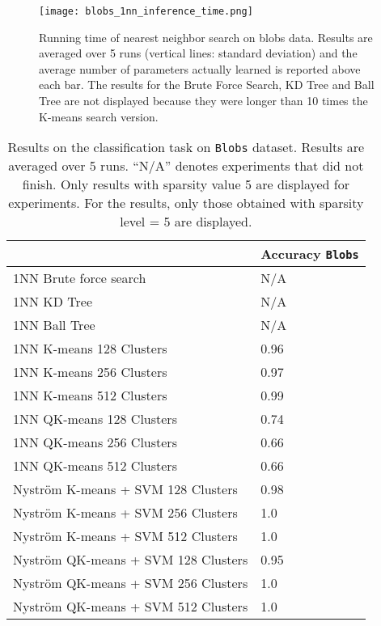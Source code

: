 \begin{figure}[tbh]
\centering
\texttt{[image: blobs\_1nn\_inference\_time.png]}
\label{fig:nn:blobs:times}

\caption{Running time of nearest neighbor search on blobs data. Results are averaged over 5 runs (vertical lines: standard deviation) and the average number of parameters actually learned is reported above each bar. The results for the Brute Force Search, KD Tree and Ball Tree are not displayed because they were longer than 10 times the K-means search version.}
\label{fig:nn:blobs}
\end{figure}

 
\begin{table}[]

\centering
\begin{tabular}{@{}l|P{2.5cm}}
\toprule
                                    & Accuracy \texttt{Blobs} \\ \midrule
1NN Brute force search              & N/A   \\
1NN KD Tree                         & N/A   \\
1NN Ball Tree                       & N/A   \\ \midrule \midrule
1NN K-means 128 Clusters            & 0.96      \\
1NN K-means 256 Clusters            & 0.97      \\
1NN K-means 512 Clusters            & 0.99      \\ \midrule
1NN QK-means 128 Clusters           & 0.74     \\
1NN QK-means 256 Clusters           & 0.66      \\
1NN QK-means 512 Clusters           & 0.66      \\ \midrule \midrule
Nyström K-means + SVM 128 Clusters  & 0.98      \\
Nyström K-means + SVM 256 Clusters  & 1.0      \\
Nyström K-means + SVM 512 Clusters  & 1.0      \\ \midrule
Nyström QK-means + SVM 128 Clusters & 0.95      \\
Nyström QK-means + SVM 256 Clusters & 1.0      \\
Nyström QK-means + SVM 512 Clusters & 1.0      \\ \bottomrule
\end{tabular}

\caption{Results on the classification task on \texttt{Blobs} dataset. Results are averaged over 5 runs. ``N/A'' denotes experiments that did not finish. Only results with sparsity value 5 are displayed for \qkmeans experiments. For the \qkmeans results, only those obtained with sparsity level = 5 are displayed.}
\label{table:results_blobs}

\end{table}

